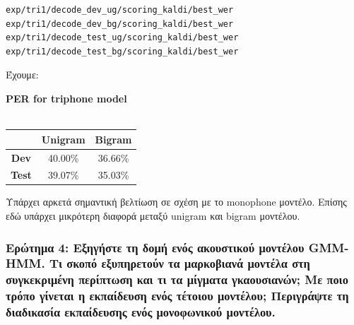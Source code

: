 \documentclass[a4paper, 12pt]{article}
\begin{document}
            \begin{verbatim}
exp/tri1/decode_dev_ug/scoring_kaldi/best_wer
exp/tri1/decode_dev_bg/scoring_kaldi/best_wer
exp/tri1/decode_test_ug/scoring_kaldi/best_wer
exp/tri1/decode_test_bg/scoring_kaldi/best_wer
            \end{verbatim}
            
            Έχουμε:
            
            \begin{center}
                \textbf{PER for triphone model} \\~\\
            
                \begin{tabular}{|c|c|c|}
                    \hline
                                  & \textbf{Unigram}   & \textbf{Bigram} \\ \hline
                    \textbf{Dev}  & 40.00\%            & 36.66\%         \\ \hline
                    \textbf{Test} & 39.07\%            & 35.03\%         \\ \hline
                \end{tabular}    
            \end{center}            
    
            Υπάρχει αρκετά σημαντική βελτίωση σε σχέση με το monophone μοντέλο. Επίσης εδώ υπάρχει μικρότερη διαφορά μεταξύ unigram και bigram μοντέλου.
    
        \subsubsection*{Ερώτημα 4: Εξηγήστε τη δομή ενός ακουστικού μοντέλου GMM-HMM. Τι σκοπό εξυπηρετούν τα μαρκοβιανά μοντέλα στη συγκεκριμένη περίπτωση και τι τα μίγματα γκαουσιανών; Με ποιο τρόπο γίνεται η εκπαίδευση ενός τέτοιου μοντέλου; Περιγράψτε τη διαδικασία εκπαίδευσης ενός μονοφωνικού μοντέλου.}
        
\end{document}
